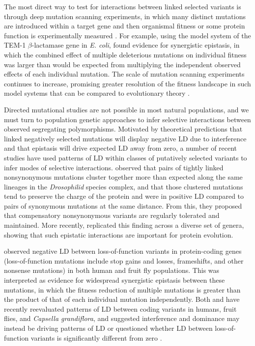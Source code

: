 \documentclass[]{article}
\begin{document}
The most direct way to test for interactions between linked selected variants
is through deep mutation scanning experiments, in which many distinct mutations
are introduced within a target gene and then organismal fitness or some protein
function is experimentally measured \citep{Romero2009-yi, Bank2015-vq,
Puchta2016-rx, Steinberg2016-is}. For example, using the model system of the
TEM-1 \(\beta\)-lactamase gene in \emph{E. coli}, \citet{Bershtein2006-bk}
found evidence for synergistic epistasis, in which the combined effect of
multiple deleterious mutations on individual fitness was larger than would be
expected from multiplying the independent observed effects of each individual
mutation. The scale of mutation scanning experiments continues to increase,
promising greater resolution of the fitness landscape in such model systems
that can be compared to evolutionary theory \citep{Otwinowski2018-zk}.

Directed mutational studies are not possible in most natural populations, and
we must turn to population genetic approaches to infer selective interactions
between observed segregating polymorphisms. Motivated by theoretical
predictions that linked negatively selected mutations will display negative LD
due to interference \citep{Hill1966-gv} and that epistasis will drive expected
LD away from zero, a number of recent studies have used patterns of LD within
classes of putatively selected variants to infer modes of selective
interactions.  \citet{Callahan2011-ac} observed that pairs of tightly linked
nonsynonymous mutations cluster together more than expected along the same
lineages in the \emph{Drosophilid} species complex, and that those clustered
mutations tend to preserve the charge of the protein and were in positive LD
compared to pairs of synonymous mutations at the same distance. From this, they
proposed that compensatory nonsynonymous variants are regularly tolerated and
maintained.  More recently, \citet{Taverner2020-lk} replicated this finding
across a diverse set of genera, showing that such epistatic interactions are
important for protein evolution.

\citet{Sohail2017-zq} observed negative LD between loss-of-function variants in
protein-coding genes (loss-of-function mutations include stop gains and losses,
frameshifts, and other nonsense mutations) in both human and fruit fly
populations. This was interpreted as evidence for widespread synergistic
epistasis between these mutations, in which the fitness reduction of multiple
mutations is greater than the product of that of each individual mutation
independently. Both \citet{Sandler2021-of} and \citet{Garcia2021-zn} have
recently reevaluated patterns of LD between coding variants in humans, fruit
flies, and \emph{Capsella grandiflora}, and suggested interference and
dominance may instead be driving patterns of LD \citep{Garcia2021-zn} or
questioned whether LD between loss-of-function variants is significantly
different from zero \citep{Sandler2021-of}.
\end{document}
